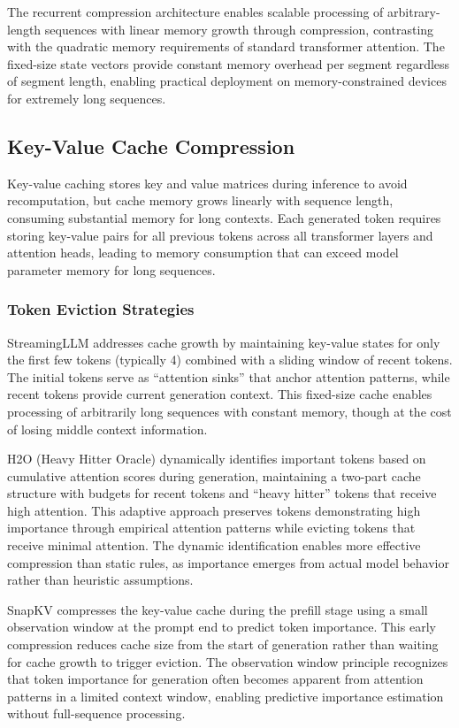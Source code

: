 The recurrent compression architecture enables scalable processing of arbitrary-length sequences with linear memory growth through compression, contrasting with the quadratic memory requirements of standard transformer attention. The fixed-size state vectors provide constant memory overhead per segment regardless of segment length, enabling practical deployment on memory-constrained devices for extremely long sequences.

\subsection{Key-Value Cache Compression}

Key-value caching stores key and value matrices during inference to avoid recomputation, but cache memory grows linearly with sequence length, consuming substantial memory for long contexts. Each generated token requires storing key-value pairs for all previous tokens across all transformer layers and attention heads, leading to memory consumption that can exceed model parameter memory for long sequences.

\subsubsection{Token Eviction Strategies}

StreamingLLM addresses cache growth by maintaining key-value states for only the first few tokens (typically 4) combined with a sliding window of recent tokens. The initial tokens serve as ``attention sinks'' that anchor attention patterns, while recent tokens provide current generation context. This fixed-size cache enables processing of arbitrarily long sequences with constant memory, though at the cost of losing middle context information.

H2O (Heavy Hitter Oracle) dynamically identifies important tokens based on cumulative attention scores during generation, maintaining a two-part cache structure with budgets for recent tokens and ``heavy hitter'' tokens that receive high attention. This adaptive approach preserves tokens demonstrating high importance through empirical attention patterns while evicting tokens that receive minimal attention. The dynamic identification enables more effective compression than static rules, as importance emerges from actual model behavior rather than heuristic assumptions.

SnapKV compresses the key-value cache during the prefill stage using a small observation window at the prompt end to predict token importance. This early compression reduces cache size from the start of generation rather than waiting for cache growth to trigger eviction. The observation window principle recognizes that token importance for generation often becomes apparent from attention patterns in a limited context window, enabling predictive importance estimation without full-sequence processing.

